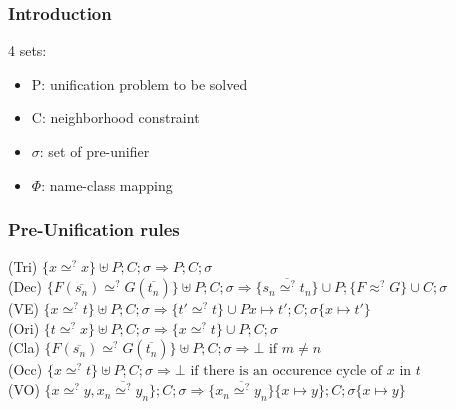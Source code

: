 

	\begin{frame}[fragile=singleslide]
	\frametitle{Introduction}
		4 sets:
		\begin{itemize}
			\item P: unification problem to be solved
			\item C: neighborhood constraint
			\item $\sigma$: set of pre-unifier
			\item $\Phi$: name-class mapping
		\end{itemize}
  \end{frame}	
		
		
	\begin{frame}[fragile=singleslide]
	\frametitle{Pre-Unification rules}
	\textcolor[rgb]{0.55,0,0}{(Tri)} \(\{x \simeq^? x\} \uplus P;C;\sigma \Rightarrow  P; C;\sigma\) \\
		\vspace{0.3cm}
		\textcolor[rgb]{0.55,0,0}{(Dec)} \(\{F(\overline{s_n}) \simeq^? G(\overline{t_n})\} \uplus  P;C;\sigma \Rightarrow \{\overline{s_n \simeq^?t_n}\}\cup P;\{F\approx^? G\}\cup  C;\sigma\) \\
		\vspace{0.3cm}
		\textcolor[rgb]{0.55,0,0}{(VE)} \(\{x \simeq^? t\} \uplus P;C;\sigma \Rightarrow  \{t'\simeq^? t\}\cup P{x\mapsto t'}; C;\sigma\{x\mapsto t'\}\) \\
		\vspace{0.3cm}
		\textcolor[rgb]{0.55,0,0}{(Ori)} \(\{t \simeq^? x\} \uplus P;C;\sigma \Rightarrow  \{x \simeq^? t\}\cup P; C;\sigma\) \\
		\vspace{0.3cm}
		\textcolor[rgb]{0.55,0,0}{(Cla)} \(\{F(\overline{s_n}) \simeq^? G(\overline{t_n})\} \uplus P;C;\sigma \Rightarrow  \bot\text{ if } m\neq n\) \\
		\vspace{0.3cm}
		\textcolor[rgb]{0.55,0,0}{(Occ)} \(\{x \simeq^? t\} \uplus P;C;\sigma \Rightarrow  \bot\text{ if there is an occurence cycle of }x\text{ in }t\) \\
		\vspace{0.3cm}
		\textcolor[rgb]{0.55,0,0}{(VO)} \(\{x \simeq^? y, \overline{x_n\simeq^? y_n}\};C;\sigma \Rightarrow  \{\overline{x_n\simeq^? y_n}\}\{x\mapsto y\}; C;\sigma\{x\mapsto y\}\) \\
		\vspace{0.3cm}
	
  \end{frame}	
		
